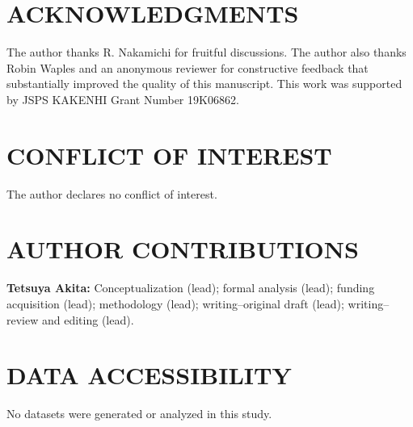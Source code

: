 \documentclass[12pt, English]{article}
\begin{document}
\begin{spacing}{1.9}
\section*{ACKNOWLEDGMENTS}
The author thanks R. Nakamichi for fruitful discussions. The author also thanks Robin Waples and an anonymous reviewer for constructive feedback that substantially improved the quality of this manuscript. This work was supported by JSPS KAKENHI Grant Number 19K06862.

\section*{CONFLICT OF INTEREST}
The author declares no conflict of interest.

\section*{AUTHOR CONTRIBUTIONS}
{\bf Tetsuya Akita:} Conceptualization (lead); formal analysis (lead); funding acquisition (lead); methodology (lead); writing--original draft (lead); writing--review and editing (lead).

\section*{DATA ACCESSIBILITY}
No datasets were generated or analyzed in this study.




\clearpage


\end{spacing}
\end{document}
